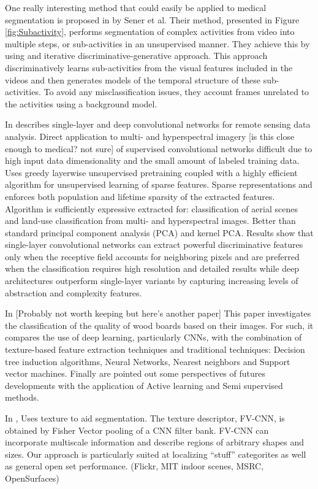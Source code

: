 \documentclass[letterpaper, 10 pt, conference]{ieeeconf}  %
\begin{document}
One really interesting method that could easily be applied to medical segmentation is proposed in \cite{Sener_2018_CVPR} by Sener et al. Their method, presented in Figure \ref{fig:Subactivity}, performs segmentation of complex activities from video into multiple steps, or sub-activities in an unsupervised manner. They achieve this by using and iterative discriminative-generative approach. This approach discriminatively learns sub-activities from the visual features included in the videos and then generates models of the temporal structure of these sub-activities. To avoid any misclassification issues, they account frames unrelated to the activities using a background model. 


In \cite{romero_unsupervised_2016} describes single-layer and deep convolutional networks for remote sensing data analysis. Direct application to multi- and hyperspectral imagery [is this close enough to medical? not sure] of supervised convolutional networks difficult due to high input data dimensionality and the  small amount of labeled training data. Uses greedy layerwise unsupervised pretraining coupled with a highly efficient algorithm for unsupervised learning of sparse features. Sparse representations and enforces both population and lifetime sparsity of the extracted features. Algorithm is sufficiently expressive extracted for: classification of aerial scenes and land-use classification from multi- and hyperspectral images. Better than standard principal component analysis (PCA) and kernel PCA. Results show that single-layer convolutional networks can extract powerful discriminative features only when the receptive field accounts for neighboring pixels and are preferred when the classification requires high resolution and detailed results while deep architectures outperform single-layer variants by capturing increasing levels of abstraction and complexity features.

In \cite{affonso_deep_2017} [Probably not worth keeping but here's another paper] This paper investigates the classification of the quality of wood boards based on their images. For such, it compares the use of deep learning, particularly CNNs, with the combination of texture-based feature extraction techniques and traditional techniques: Decision tree induction algorithms, Neural Networks, Nearest neighbors and Support vector machines. Finally are pointed out some perspectives of futures developments with the application of Active learning and Semi supervised methods.

In \cite{cimpoi_deep_2015}, Uses texture to aid segmentation. The texture descriptor, FV-CNN, is obtained by Fisher Vector pooling of a CNN filter bank. FV-CNN can incorporate multiscale information and describe regions of arbitrary shapes and sizes. Our approach is particularly suited at localizing “stuff” categorites as well as general open set performance. (Flickr, MIT indoor scenes, MSRC, OpenSurfaces)
\end{document}
